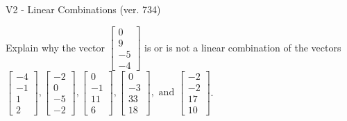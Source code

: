 \begin{exercise}
  \begin{exerciseTitle}V2 - Linear Combinations (ver. 734)\end{exerciseTitle}
  \begin{exerciseStatement}
    Explain why the vector \(\left[\begin{array}{c}
0 \\
9 \\
-5 \\
-4
\end{array}\right]\)  is or is not a linear 
	combination of the vectors \(\left[\begin{array}{c}
-4 \\
-1 \\
1 \\
2
\end{array}\right] , \left[\begin{array}{c}
-2 \\
0 \\
-5 \\
-2
\end{array}\right] , \left[\begin{array}{c}
0 \\
-1 \\
11 \\
6
\end{array}\right] , \left[\begin{array}{c}
0 \\
-3 \\
33 \\
18
\end{array}\right] , \text{ and } \left[\begin{array}{c}
-2 \\
-2 \\
17 \\
10
\end{array}\right]\).
	



\end{exerciseStatement}
\end{exercise}
